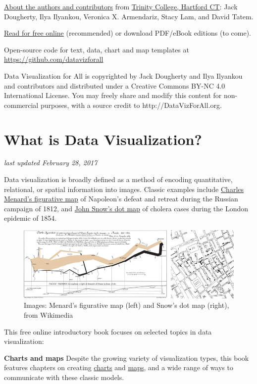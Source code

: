 \documentclass[
  english,
]{book}
\begin{document}
\href{authors}{About the authors and contributors} from \href{http://www.trincoll.edu}{Trinity College, Hartford CT}: Jack Dougherty, Ilya Ilyankou, Veronica X. Armendariz, Stacy Lam, and David Tatem.

\href{https://datavizforall.org}{Read for free online} (recommended) or download PDF/eBook editions (to come).

Open-source code for text, data, chart and map templates at \url{https://github.com/datavizforall}

Data Visualization for All is copyrighted
by Jack Dougherty and Ilya Ilyankou and contributors
and distributed under a Creative Commons BY-NC 4.0 International License.
You may freely share and modify this content for non-commercial purposes, with a source credit to http://DataVizForAll.org.

\hypertarget{what}{%
\section{What is Data Visualization?}\label{what}}

\emph{last updated February 28, 2017}

Data visualization is broadly defined as a method of encoding quantitative, relational, or spatial information into images. Classic examples include \href{https://en.wikipedia.org/wiki/Charles_Joseph_Minard}{Charles Menard's figurative map} of Napoleon's defeat and retreat during the Russian campaign of 1812, and \href{https://en.wikipedia.org/wiki/John_Snow}{John Snow's dot map} of cholera cases during the London epidemic of 1854.

\begin{figure}
\centering
\includegraphics{images/0-introduction/examples-Minard-Snow.png}
\caption{Images: Menard's figurative map (left) and Snow's dot map (right), from Wikimedia}
\end{figure}

This free online introductory book focuses on selected topics in data visualization:

\textbf{Charts and maps} Despite the growing variety of visualization types, this book features chapters on creating \href{chart}{charts} and \href{map}{maps}, and a wide range of ways to communicate with these classic models.
\end{document}
